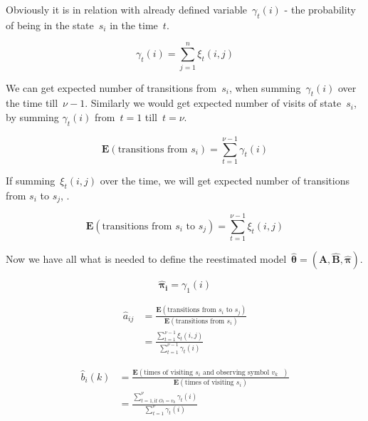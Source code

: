 \documentclass[thesis=M,english]{FITthesis}[2012/10/20]
\newcommand{\matr}[1]{\mathbf{#1}}
\begin{document}
Obviously it is in relation with already defined variable~$\gamma_t(i)$ - the probability of being in the state~$s_i$ in the time~$t$.

\begin{equation}
\gamma_t(i) = \sum_{j=1}^n \xi_t(i,j)  
\end{equation}

We can get expected number of transitions from~$s_i$, when summing~$\gamma_t(i)$ over the time till~$\nu-1$. Similarly we would get expected number of visits of state~$s_i$, by summing $\gamma_t(i)$ from~$t=1$ till~$t=\nu$. 

\begin{equation}
\mathbf{E}(\text{transitions from $s_i$}) = \sum_{t=1}^{\nu-1} \gamma_t(i)  
\end{equation}

If summing~$\xi_t(i,j)$ over the time, we will get expected number of transitions from $s_i$ to $s_j$, . 

\begin{equation}
\mathbf{E}(\text{transitions from $s_i$ to $s_j$}) = \sum_{t=1}^{\nu-1} \xi_t(i,j)  
\end{equation}

Now we have all what is needed to define the reestimated model~$\boldsymbol{\hat{\theta}}=({\matr{\hat A}},{\matr{\hat B}},\boldsymbol{\hat\pi})$.

\begin{equation}\label{eq:bwpi}
\boldsymbol{\hat\pi_i} = \gamma_1(i)  
\end{equation}

\begin{equation}\label{eq:bwa}
\begin{aligned}
\hat a_{ij} &= \frac{\mathbf{E}(\text{transitions from $s_i$ to $s_j$})}
				   {\mathbf{E}(\text{transitions from $s_i$})}  \\
		    &= \frac{\sum\limits_{t=1}^{\nu-1} \xi_t(i,j)}{\sum\limits_{t=1}^{\nu-1} \gamma_t(i) }
\end{aligned}
\end{equation}

\begin{equation}\label{eq:bwb}
\begin{aligned}
\hat b_{i}(k) &= \frac{\mathbf{E}(\text{times of visiting $s_i$ and observing symbol $v_k$ })}
				   {\mathbf{E}(\text{times of visiting $s_i$})} \\
			  &= \frac{\sum\limits_{t=1, \text{if } O_t = v_k  }^{\nu} \gamma_t(i)}{\sum\limits_{t=1}^{\nu} \gamma_t(i) } 
\end{aligned}
\end{equation}
\end{document}
